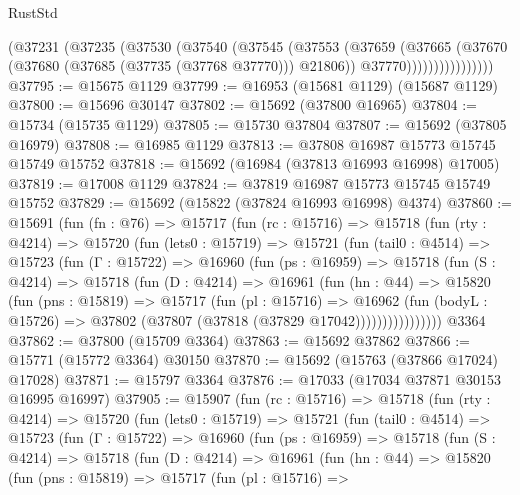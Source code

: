 \begin{lexlean}{RustStd}
\begin{coremodule}
                    (@37231
                      (@37235
                        (@37530
                          (@37540
                            (@37545
                              (@37553
                                (@37659
                                  (@37665
                                    (@37670 (@37680 (@37685 (@37735 (@37768 @37770))) @21806))
                                    @37770))))))))))))))))
@37795 := @15675 @1129
@37799 := @16953 (@15681 @1129) (@15687 @1129)
@37800 := @15696 @30147
@37802 := @15692 (@37800 @16965)
@37804 := @15734 (@15735 @1129)
@37805 := @15730 @37804
@37807 := @15692 (@37805 @16979)
@37808 := @16985 @1129
@37813 := @37808 @16987 @15773 @15745 @15749 @15752
@37818 := @15692 (@16984 (@37813 @16993 @16998) @17005)
@37819 := @17008 @1129
@37824 := @37819 @16987 @15773 @15745 @15749 @15752
@37829 := @15692 (@15822 (@37824 @16993 @16998) @4374)
@37860 := @15691
    (fun (fn : @76) =>
    @15717
      (fun (rc : @15716) =>
      @15718
        (fun (rty : @4214) =>
        @15720
          (fun (lets0 : @15719) =>
          @15721
            (fun (tail0 : @4514) =>
            @15723
              (fun (Γ : @15722) =>
              @16960
                (fun (ps : @16959) =>
                @15718
                  (fun (S : @4214) =>
                  @15718
                    (fun (D : @4214) =>
                    @16961
                      (fun (hn : @44) =>
                      @15820
                        (fun (pns : @15819) =>
                        @15717
                          (fun (pl : @15716) =>
                          @16962
                            (fun (bodyL : @15726) =>
                            @37802 (@37807 (@37818 (@37829 @17042))))))))))))))))
    @3364
@37862 := @37800 (@15709 @3364)
@37863 := @15692 @37862
@37866 := @15771 (@15772 @3364) @30150
@37870 := @15692 (@15763 (@37866 @17024) @17028)
@37871 := @15797 @3364
@37876 := @17033 (@17034 @37871 @30153 @16995 @16997)
@37905 := @15907
    (fun (rc : @15716) =>
    @15718
      (fun (rty : @4214) =>
      @15720
        (fun (lets0 : @15719) =>
        @15721
          (fun (tail0 : @4514) =>
          @15723
            (fun (Γ : @15722) =>
            @16960
              (fun (ps : @16959) =>
              @15718
                (fun (S : @4214) =>
                @15718
                  (fun (D : @4214) =>
                  @16961
                    (fun (hn : @44) =>
                    @15820
                      (fun (pns : @15819) =>
                      @15717
                        (fun (pl : @15716) =>

\end{coremodule}
\end{lexlean}
